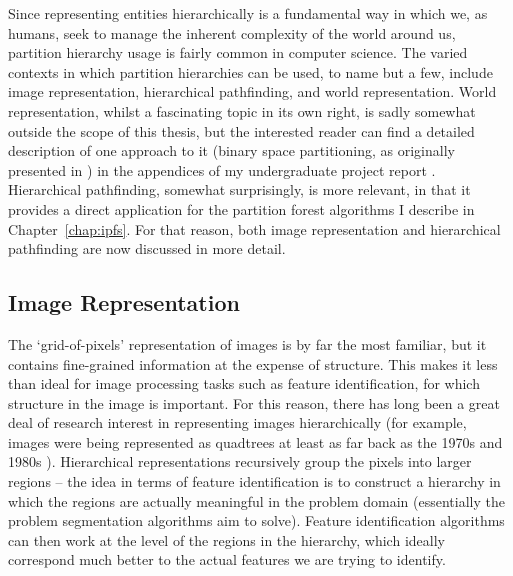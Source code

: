 Since representing entities hierarchically is a fundamental way in which we, as humans, seek to manage the inherent complexity of the world around us, partition hierarchy usage is fairly common in computer science. The varied contexts in which partition hierarchies can be used, to name but a few, include image representation, hierarchical pathfinding, and world representation. World representation, whilst a fascinating topic in its own right, is sadly somewhat outside the scope of this thesis, but the interested reader can find a detailed description of one approach to it (binary space partitioning, as originally presented in \cite{fuchs80}) in the appendices of my undergraduate project report \cite{golodetz06}. Hierarchical pathfinding, somewhat surprisingly, is more relevant, in that it provides a direct application for the partition forest algorithms I describe in Chapter~\ref{chap:ipfs}. For that reason, both image representation and hierarchical pathfinding are now discussed in more detail.

\subsection{Image Representation}
\label{subsec:background-partitionhierarchies-imagerepresentation}

The `grid-of-pixels' representation of images is by far the most familiar, but it contains fine-grained information at the expense of structure. This makes it less than ideal for image processing tasks such as feature identification, for which structure in the image is important. For this reason, there has long been a great deal of research interest in representing images hierarchically (for example, images were being represented as quadtrees at least as far back as the 1970s \cite{klinger76} and 1980s \cite{ahuja83,samet80}). Hierarchical representations recursively group the pixels into larger regions -- the idea in terms of feature identification is to construct a hierarchy in which the regions are actually meaningful in the problem domain (essentially the problem segmentation algorithms aim to solve). Feature identification algorithms can then work at the level of the regions in the hierarchy, which ideally correspond much better to the actual features we are trying to identify.

